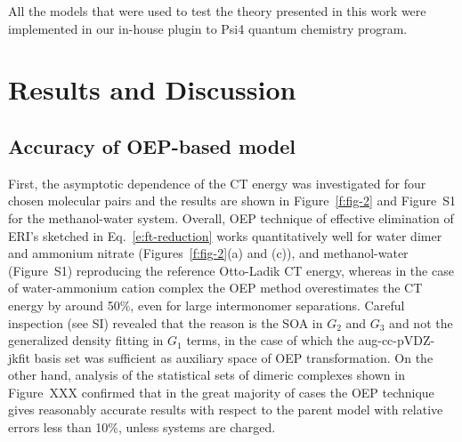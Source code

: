 All the models that were used to test the theory presented in this work
were implemented in our in\hyp{}house plugin to {\sc Psi4} quantum chemistry program.\cite{Psi4.JCTC.2017}

\section{\label{s:5.results}Results and Discussion}

\subsection{\label{ss:5.1.accuracy}Accuracy of OEP-based model}

First, the asymptotic dependence of the CT energy
was investigated for four chosen molecular pairs and the results are
shown in Figure~\ref{f:fig-2} and Figure~S1 for the methanol-water system. 
Overall, OEP technique of effective
elimination of ERI's sketched in Eq.~\eqref{e:ft-reduction} 
works
quantitatively well for water dimer and ammonium nitrate (Figures~\ref{f:fig-2}(a) and (c)),
and methanol-water (Figure~S1)
reproducing the reference Otto\hyp{}Ladik CT energy,
whereas in the case of water\hyp{}ammonium cation complex the OEP
method overestimates the CT energy by around 50\%, even for large
intermonomer separations. Careful inspection
(see SI)
revealed that the reason is the SOA in $G_2$ and $G_3$ and not
the generalized density fitting in $G_1$ terms, in the case of which
the aug-cc-pVDZ-jkfit basis set was sufficient as auxiliary space of OEP transformation.
On the other hand, analysis of the statistical sets of dimeric complexes
shown in Figure~XXX
confirmed that in the great majority of cases the 
OEP technique gives reasonably accurate results with respect
to the parent model with relative errors less than 10\%,
unless systems are charged.
%

